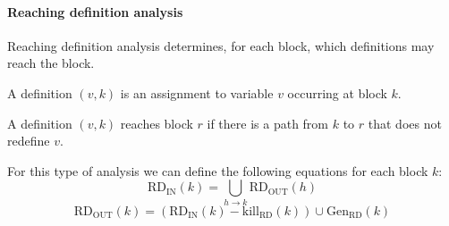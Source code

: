 \paragraph*{Reaching definition analysis}
Reaching definition analysis determines, for each block, which definitions may reach the block. 
\begin{definition}
    A definition $(v,k)$ is an assignment to variable $v$ occurring at block $k$. 
\end{definition}
\begin{definition}
    A definition $(v,k)$ reaches block $r$ if there is a path from $k$ to $r$ that does not redefine $v$.
\end{definition}
For this type of analysis we can define the following equations for each block $k$: 
\[\text{RD}_{\text{IN}}(k)= \bigcup_{h \rightarrow k}\text{RD}_{\text{OUT}}(h)\]
\[\text{RD}_{\text{OUT}}(k)= \left(\text{RD}_{\text{IN}}(k) - \text{kill}_{\text{RD}}(k) \right) \cup \text{Gen}_{\text{RD}}(k)\]

